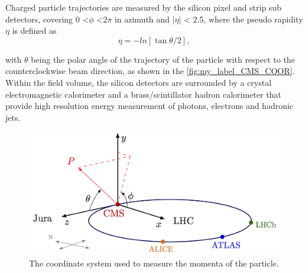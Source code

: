 
 Charged particle trajectories are measured by the silicon pixel and strip sub detectors\cite{Palichik:2018wwn}, covering 0 <$\phi$ <2$\pi$ in azimuth and $|\eta|$ < 2.5, where the pseudo rapidity $\eta$ is defined as 
 \begin{equation*}
     \eta = -ln[\tan \theta/2],
 \end{equation*}
 
 with $\theta$ being the polar angle of the trajectory of the particle with respect to the
 counterclockwise beam direction, as shown in the \autoref{fig:my_label_CMS_COOR}. Within the field
volume, the silicon detectors are surrounded by a crystal electromagnetic calorimeter and a brass/scintillator hadron calorimeter that provide high resolution energy measurement of photons, electrons and hadronic jets.

\begin{figure}[H]
    \centering
    \includegraphics{figure_1/cms_coordinate_system.png}
    \caption{The coordinate system used to measure the momenta of the particle.}
    \label{fig:my_label_CMS_COOR}
\end{figure}


